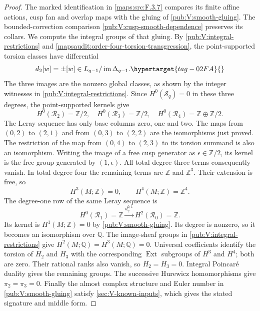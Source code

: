 \begin{proof}
The marked identification in \cref{maps:src:F.3.7} compares its
finite affine actions, cusp fan and overlap maps with the gluing
of \cref{pub:V:smooth-gluing}. The bounded-correction comparison
\cref{pub:V:cusp-smooth-dependence} preserves its collars.
We compute the integral groups of that gluing.
By \cref{pub:V:integral-restrictions} and
\cref{mapsaudit:order-four-torsion-transgression}, the point-supported
torsion classes have differential
\begin{equation}
 d_2[w]=\pm[w]\in L_{q-1}/\operatorname{im}\Delta_{q-1}.
 \hypertarget{tag-02FA}{}\label{maps:eq:F.6}
\end{equation}
The three images are the nonzero global classes, as shown by the
integer witnesses in \cref{pub:V:integral-restrictions}.
Since $H^0(\mathcal S_q)=0$ in these three degrees, the
point-supported kernels give
\[
 H^0(\mathcal R_2)=\mathbb Z/2,\quad
 H^0(\mathcal R_3)=\mathbb Z/2,\quad
 H^0(\mathcal R_4)=\mathbb Z\oplus\mathbb Z/2.
\]
The Leray sequence
\cite[Tag 01F2, Lemma 20.13.4; chapter PDF p.~22]{StacksProject}
has only base columns zero, one and two.
The maps from $(0,2)$ to $(2,1)$ and from $(0,3)$ to $(2,2)$ are
the isomorphisms just proved.  The restriction of the map from
$(0,4)$ to $(2,3)$ to its torsion summand is also an isomorphism.
Writing the image of a free cusp generator as $\epsilon\in\mathbb Z/2$,
its kernel is the free group generated by $(1,\epsilon)$.
All total-degree-three terms consequently vanish.  In total degree
four the remaining terms are $\mathbb Z$ and $\mathbb Z^3$.
Their extension is free, so
\[
                   H^3(M;\mathbb Z)=0,\qquad
                   H^4(M;\mathbb Z)=\mathbb Z^4.
\]
The degree-one row of the same Leray sequence is
\[
 H^0(\mathcal R_1)=\mathbb Z
 \xrightarrow{d_2^{0,1}}H^2(\mathcal R_0)=\mathbb Z.
\]
Its kernel is $H^1(M;\mathbb Z)=0$ by
\cref{pub:V:smooth-gluing}. Its degree is nonzero, so it becomes
an isomorphism over $\mathbb Q$. The image-sheaf groups in
\cref{pub:V:integral-restrictions} give
$H^2(M;\mathbb Q)=H^3(M;\mathbb Q)=0$.
Universal coefficients
\cite[Theorem~3.2 and Corollary~3.3, pp.~195--196]{Hatcher2002}
identify the torsion of $H_2$ and $H_3$ with the corresponding
$\operatorname{Ext}$ subgroups of $H^3$ and $H^4$; both are zero.
Their rational ranks also vanish, so $H_2=H_3=0$.
Integral Poincar\'e duality
\cite[Theorem~3.30, p.~241]{Hatcher2002} gives the remaining groups.
The successive Hurewicz homomorphisms
\cite[Theorem~4.32, p.~366]{Hatcher2002} give $\pi_2=\pi_3=0$.
Finally the almost complex structure and Euler number in
\cref{pub:V:smooth-gluing} satisfy
\cref{sec:V-known-inputs}, which gives the stated signature and
middle form.
\end{proof}






















